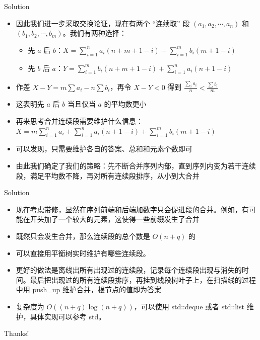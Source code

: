 ﻿\documentclass[aspectratio=169]{ctexbeamer}
\begin{document}
\begin{frame}{Solution}
    \begin{itemize}
        \item 因此我们进一步采取交换论证，现在有两个 “连续取” 段 $(a_1,a_2,\cdots, a_n)$ 和 $(b_1,b_2,\cdots, b_m)$。我们有两种选择：
        \begin{itemize}
            \item 先 $a$ 后 $b$：$X=\sum_{i=1}^n a_i(n+m+1-i)+\sum_{i=1}^mb_i(m+1-i)$
            \item 先 $b$ 后 $a$：$Y=\sum_{i=1}^m b_i(n+m+1-i)+\sum_{i=1}^na_i(n+1-i)$
        \end{itemize} 
        \item 作差 $X-Y=m\sum a_i-n\sum b_i$，再令 $X-Y<0$ 得到 $\frac{\sum_i a_i}{n}<\frac{\sum b_i}{m}$
        \item 这表明先 $a$ 后 $b$ 当且仅当 $a$ 的平均数更小
        \item 再来思考合并连续段需要维护什么信息：$X=m\sum_{i=1}^n a_i+\sum_{i=1}^n a_i(n+1-i)+\sum_{i=1}^mb_i(m+1-i)$
        \item 可以发现，只需要维护各自的答案、总和和元素个数即可
        \item 由此我们确定了我们的策略：先不断合并序列内部，直到序列内变为若干连续段，满足平均数不降，再对所有连续段排序，从小到大合并
    \end{itemize}
\end{frame}

\begin{frame}{Solution}
    \begin{itemize}
        \item 现在考虑带修，显然在序列前端和后端加数字只会促进段的合并。例如，有可能在开头加了一个较大的元素，这使得一些前缀发生了合并
        \item 既然只会发生合并，那么连续段的总个数是 $O(n+q)$ 的
        \item 可以直接用平衡树实时维护有哪些连续段。
        \item 更好的做法是离线出所有出现过的连续段，记录每个连续段出现与消失的时间。最后把出现过的所有连续段排序，再挂到线段树叶子上，在扫描线的过程中用 push\_up 维护合并，根节点的值即为答案
        \item 复杂度为 $O((n+q)\log(n+q))$，可以使用 std::deque 或者 std::list 维护，具体实现可以参考 std。
    \end{itemize}
\end{frame}







\begin{frame}
    \begin{center}
        {\Huge\calligra Thanks!}
    \end{center}
\end{frame}
\end{document}
